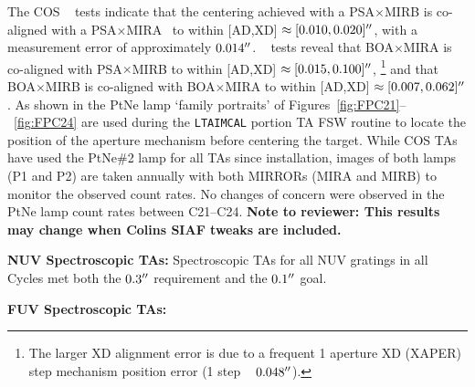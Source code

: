 \begin{description}
	The COS ~ tests indicate that the centering achieved with a PSA$\times$MIRB  is co-aligned with a PSA$\times$MIRA ~to within [AD,XD] $\approx [0.010,0.020]\hbox{$^{\prime\prime}$}$, with a measurement error of approximately $0.014\hbox{$^{\prime\prime}$}$.
	~ tests reveal that BOA$\times$MIRA is co-aligned with PSA$\times$MIRB to within [AD,XD] $\approx [0.015,0.100]\hbox{$^{\prime\prime}$}$,
	\footnote{The larger XD alignment error is due to a frequent 1 aperture XD (XAPER) step mechanism position error (1 step ~ $0.048\hbox{$^{\prime\prime}$}$).}
	and that BOA$\times$MIRB is co-aligned with BOA$\times$MIRA to within [AD,XD] $\approx [0.007,0.062]\hbox{$^{\prime\prime}$}$.
	As shown in the PtNe lamp `family portraits' of Figures~\ref{fig:FPC21}--~\ref{fig:FPC24} are used during the \texttt{LTAIMCAL} portion  TA FSW routine to locate the position of the aperture mechanism before centering the target.
	While COS TAs have used the PtNe\#2 lamp for all TAs since installation, images of both lamps (P1 and P2) are taken annually with both MIRRORs
	(MIRA and MIRB) to monitor the observed count rates. No changes of concern were observed in the PtNe lamp count rates between C21--C24.
	{\bf Note to reviewer: This results may change when Colins SIAF tweaks are included.}
\item{\bf NUV Spectroscopic TAs:}
	Spectroscopic TAs for all NUV gratings in all Cycles met both the $0.3\hbox{$^{\prime\prime}$}$ requirement and the $0.1\hbox{$^{\prime\prime}$}$ goal.
\item{\bf FUV Spectroscopic TAs:}

\end{description}
